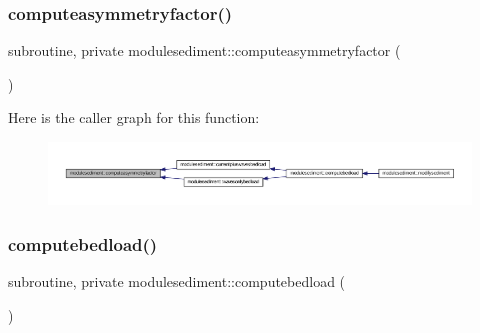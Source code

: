 \subsubsection{\texorpdfstring{computeasymmetryfactor()}{computeasymmetryfactor()}}
{\footnotesize\ttfamily subroutine, private modulesediment\+::computeasymmetryfactor (\begin{DoxyParamCaption}{ }\end{DoxyParamCaption})\hspace{0.3cm}{\ttfamily [private]}}

Here is the caller graph for this function\+:\nopagebreak
\begin{figure}[H]
\begin{center}
\leavevmode
\includegraphics[width=350pt]{namespacemodulesediment_a7f0383935c0a22b77c959d32f6fa82e5_icgraph}
\end{center}
\end{figure}
\mbox{\label{namespacemodulesediment_a621ed127ad378409a67e67c54993d3cb}} 
\subsubsection{\texorpdfstring{computebedload()}{computebedload()}}
{\footnotesize\ttfamily subroutine, private modulesediment\+::computebedload (\begin{DoxyParamCaption}{ }\end{DoxyParamCaption})\hspace{0.3cm}{\ttfamily [private]}}

